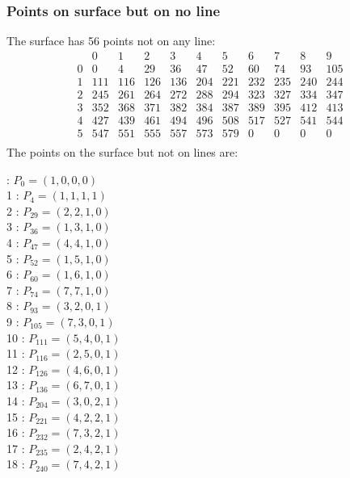 \documentclass{article}
\begin{document}
{\subsubsection*{Points on surface but on no line}
The surface has 56 points not on any line:\\
$$
\begin{array}{r|*{10}{r}}
 & 0 & 1 & 2 & 3 & 4 & 5 & 6 & 7 & 8 & 9\\
\hline
0 & 0 & 4 & 29 & 36 & 47 & 52 & 60 & 74 & 93 & 105\\
1 & 111 & 116 & 126 & 136 & 204 & 221 & 232 & 235 & 240 & 244\\
2 & 245 & 261 & 264 & 272 & 288 & 294 & 323 & 327 & 334 & 347\\
3 & 352 & 368 & 371 & 382 & 384 & 387 & 389 & 395 & 412 & 413\\
4 & 427 & 439 & 461 & 494 & 496 & 508 & 517 & 527 & 541 & 544\\
5 & 547 & 551 & 555 & 557 & 573 & 579 & 0 & 0 & 0 & 0\\
\end{array}
$$
The points on the surface but not on lines are:\\
\begin{multicols}{2}
 : $P_{0}=( 1, 0, 0, 0 )$\\
1 : $P_{4}=( 1, 1, 1, 1 )$\\
2 : $P_{29}=( 2, 2, 1, 0 )$\\
3 : $P_{36}=( 1, 3, 1, 0 )$\\
4 : $P_{47}=( 4, 4, 1, 0 )$\\
5 : $P_{52}=( 1, 5, 1, 0 )$\\
6 : $P_{60}=( 1, 6, 1, 0 )$\\
7 : $P_{74}=( 7, 7, 1, 0 )$\\
8 : $P_{93}=( 3, 2, 0, 1 )$\\
9 : $P_{105}=( 7, 3, 0, 1 )$\\
10 : $P_{111}=( 5, 4, 0, 1 )$\\
11 : $P_{116}=( 2, 5, 0, 1 )$\\
12 : $P_{126}=( 4, 6, 0, 1 )$\\
13 : $P_{136}=( 6, 7, 0, 1 )$\\
14 : $P_{204}=( 3, 0, 2, 1 )$\\
15 : $P_{221}=( 4, 2, 2, 1 )$\\
16 : $P_{232}=( 7, 3, 2, 1 )$\\
17 : $P_{235}=( 2, 4, 2, 1 )$\\
18 : $P_{240}=( 7, 4, 2, 1 )$\\

\end{multicols}}
\end{document}
